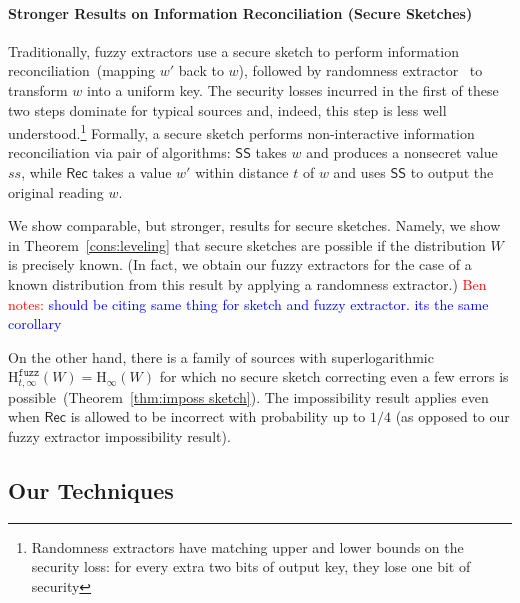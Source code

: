 \documentclass[11pt]{article}
\newcommand{\thref}[1]{\mbox{Theorem~\ref{#1}}}
\newcommand{\class}[1]{{\ensuremath{\mathsf{#1}}}}
\newcommand{\sketch}{\ensuremath{\class{SS}}\xspace}
\newcommand{\rec}{\ensuremath{\class{Rec}}\xspace}
\newcommand{\Hoo}{\mathrm{H}_\infty}
\newcommand{\Hfuzz}{\mathrm{H}^{\mathtt{fuzz}}_{t,\infty}}
\newcommand{\authnote}[2]{{\textcolor{red}{\textsf{#1 notes: }\textcolor{blue}{ #2}}\marginpar{\textcolor{red}{\textbf{!!!!!}}}}}
\newcommand{\authnote}[2]{}
\newcommand{\bnote}[1]{{\authnote{Ben}{#1}}}
\begin{document}
\paragraph{Stronger Results on Information Reconciliation (Secure Sketches)}
Traditionally, fuzzy extractors use a secure sketch to perform information reconciliation~(mapping $w'$ back to $w$), followed by randomness extractor~\cite{nisan1993randomness} to transform $w$ into a uniform key.  The security losses incurred in the first of these two steps dominate for typical sources and, indeed, this step is less well understood.\footnote{Randomness extractors have matching upper and lower bounds on the security loss: for every extra two bits of output key, they lose one bit of security} Formally, a secure sketch performs non-interactive information reconciliation via pair of algorithms: $\sketch$ takes $w$ and produces a nonsecret value $ss$, while $\rec$ takes a value $w'$ within distance $t$ of $w$ and uses $\sketch$ to output the original reading $w$.  

We show comparable, but stronger, results for secure sketches.  Namely, we show in \thref{cons:leveling} that secure sketches are possible if the distribution $W$ is precisely known. (In fact, we obtain our fuzzy extractors for the case of a known distribution from this result by applying a randomness extractor.) \bnote{should be citing same thing for sketch and fuzzy extractor.  its the same corollary} 

On the other hand, there is a family of sources with superlogarithmic $\Hfuzz(W)=\Hoo(W)$ for which no secure sketch correcting even a few errors is possible~(\thref{thm:imposs sketch}). The impossibility result applies even when $\rec$ is allowed to be incorrect with probability up to $1/4$ (as opposed to our fuzzy extractor impossibility result).

\subsection{Our Techniques}
\end{document}
